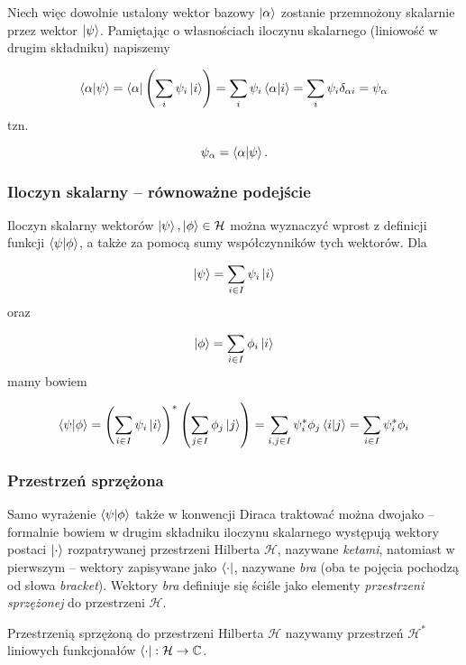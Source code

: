 Niech więc dowolnie ustalony wektor bazowy $\ket{\alpha}$ zostanie przemnożony skalarnie przez wektor $\ket{\psi}$. Pamiętając o własnościach iloczynu skalarnego (liniowość w drugim składniku) napiszemy 

$$
    \bra{\alpha}\ket{\psi} = \bra{\alpha}\left(\sum\limits_{i}\psi_{i}\ket{i}\right) = \sum\limits_{i}\psi_{i} \bra{\alpha}\ket{i} = \sum\limits_{i}\psi_{i}\delta_{\alpha i}=\psi_{\alpha}
$$
tzn.

$$
    \psi_{\alpha}=\bra{\alpha}\ket{\psi}.
$$

\subsubsection{Iloczyn skalarny -- równoważne podejście}

Iloczyn skalarny wektorów $\ket{\psi}, \ket{\phi} \in \mathcal{H}$ można wyznaczyć wprost z definicji funkcji $\bra{\psi}\ket{\phi}$, a także za pomocą sumy współczynników tych wektorów. Dla

$$
    \ket{\psi} = \sum\limits_{i\in I}\psi_{i}\ket{i}
$$
oraz

$$
    \ket{\phi} = \sum\limits_{i\in I}\phi_{i}\ket{i}
$$
mamy bowiem

$$
    \bra{\psi}\ket{\phi} = \left(\sum\limits_{i \in I}\psi_{i}\ket{i}\right)^{*}\left(\sum\limits_{j\in I}\phi_{j}\ket{j}\right) = \sum\limits_{i, j \in I}\psi_{i} ^ {*}\phi_{j}\bra{i}\ket{j}=\sum\limits_{i \in I}\psi_{i}^{*}\phi_{i}
$$

\subsubsection{Przestrzeń sprzężona}

Samo wyrażenie $\bra{\psi}\ket{\phi}$ także w konwencji Diraca traktować można dwojako -- formalnie bowiem w drugim składniku iloczynu skalarnego występują wektory postaci $\ket{\cdot}$ rozpatrywanej przestrzeni Hilberta $\mathcal{H}$, nazywane \textit{ketami}, natomiast w pierwszym -- wektory zapisywane jako $\bra{\cdot}$, nazywane \textit{bra} (oba te pojęcia pochodzą od słowa \textit{bracket}). Wektory \textit{bra} definiuje się ściśle jako elementy \textit{przestrzeni sprzężonej} do przestrzeni $\mathcal{H}$.

\begin{definition}
    Przestrzenią sprzężoną do przestrzeni Hilberta $\mathcal{H}$ nazywamy przestrzeń $\mathcal{H}^{*}$ liniowych funkcjonałów $\bra{\cdot} : \mathcal{H} \rightarrow \mathbb{C}$.
\end{definition}

